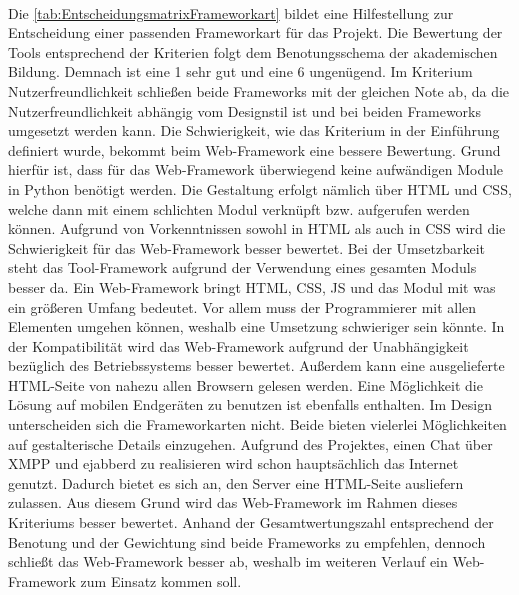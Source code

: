 \documentclass[a4paper,titlepage,halfparskip,12pt]{scrreprt}
\begin{document}
\begin{onehalfspacing}
\begin{table}[h]
	\label{tab:EntscheidungsmatrixFrameworkart}
\end{table} \\
Die \autoref{tab:EntscheidungsmatrixFrameworkart} bildet eine Hilfestellung zur Entscheidung einer passenden Frameworkart für das Projekt. Die Bewertung der Tools entsprechend der Kriterien folgt dem Benotungsschema der akademischen Bildung. Demnach ist eine 1 sehr gut und eine 6 ungenügend. Im Kriterium Nutzerfreundlichkeit schließen beide Frameworks mit der gleichen Note ab, da die Nutzerfreundlichkeit abhängig vom Designstil ist und bei beiden Frameworks umgesetzt werden kann. Die Schwierigkeit, wie das Kriterium in der Einführung definiert wurde, bekommt beim Web-Framework eine bessere Bewertung. Grund hierfür ist, dass für das Web-Framework überwiegend keine aufwändigen Module in Python benötigt werden. Die Gestaltung erfolgt nämlich über \ac{HTML} und \ac{CSS}, welche dann mit einem schlichten Modul verknüpft bzw. aufgerufen werden können. Aufgrund von Vorkenntnissen sowohl in \ac{HTML} als auch in \ac{CSS} wird die Schwierigkeit für das Web-Framework besser bewertet. Bei der Umsetzbarkeit steht das Tool-Framework aufgrund der Verwendung eines gesamten Moduls besser da. Ein Web-Framework bringt \ac{HTML}, \ac{CSS}, \ac{JS} und das Modul mit was ein größeren Umfang bedeutet. Vor allem muss der Programmierer mit allen Elementen umgehen können, weshalb eine Umsetzung schwieriger sein könnte. In der Kompatibilität wird das Web-Framework aufgrund der Unabhängigkeit bezüglich des Betriebssystems besser bewertet. Außerdem kann eine ausgelieferte \ac{HTML}-Seite von nahezu allen Browsern gelesen werden. Eine Möglichkeit die Lösung auf mobilen Endgeräten zu benutzen ist ebenfalls enthalten. Im Design unterscheiden sich die Frameworkarten nicht. Beide bieten vielerlei Möglichkeiten auf gestalterische Details einzugehen. Aufgrund des Projektes, einen Chat über \ac{XMPP} und ejabberd zu realisieren wird schon hauptsächlich das Internet genutzt. Dadurch bietet es sich an, den Server eine \ac{HTML}-Seite ausliefern zulassen. Aus diesem Grund wird das Web-Framework im Rahmen dieses Kriteriums besser bewertet. Anhand der Gesamtwertungszahl entsprechend der Benotung und der Gewichtung sind beide Frameworks zu empfehlen, dennoch schließt das Web-Framework besser ab, weshalb im weiteren Verlauf ein Web-Framework zum Einsatz kommen soll. \cite{FrameworkOverview} \cite{WebFramework}\\ 

\end{onehalfspacing}
\end{document}
